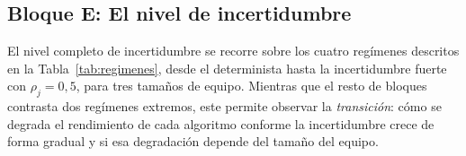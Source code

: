 \subsection{Bloque E: El nivel de incertidumbre} \label{subsec:casos-bloqueE}
El nivel completo de incertidumbre se recorre sobre los cuatro regímenes descritos en la Tabla~\ref{tab:regimenes}, desde el determinista hasta la incertidumbre fuerte con $\rho_j=0{,}5$, para tres tamaños de equipo. Mientras que el resto de bloques contrasta dos regímenes extremos, este permite observar la \emph{transición}: cómo se degrada el rendimiento de cada algoritmo conforme la incertidumbre crece de forma gradual y si esa degradación depende del tamaño del equipo.

